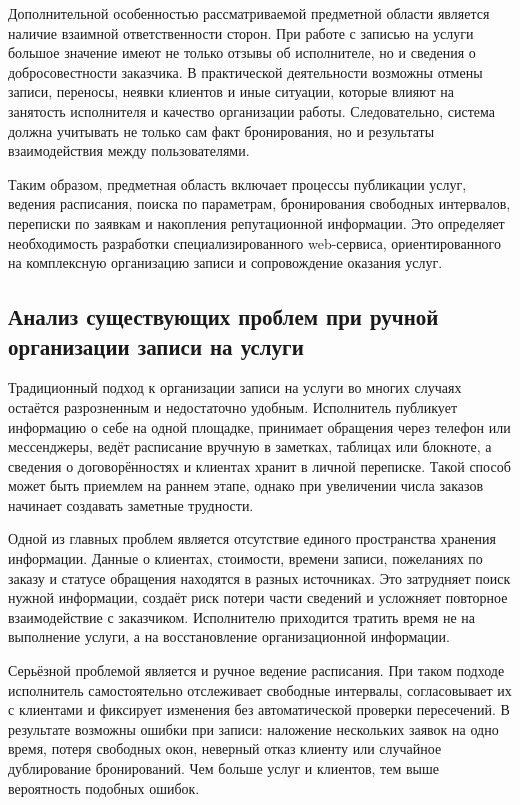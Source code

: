 Дополнительной особенностью рассматриваемой предметной области является наличие взаимной ответственности сторон. При работе с записью на услуги большое значение имеют не только отзывы об исполнителе, но и сведения о добросовестности заказчика. В практической деятельности возможны отмены записи, переносы, неявки клиентов и иные ситуации, которые влияют на занятость исполнителя и качество организации работы. Следовательно, система должна учитывать не только сам факт бронирования, но и результаты взаимодействия между пользователями.

Таким образом, предметная область включает процессы публикации услуг, ведения расписания, поиска по параметрам, бронирования свободных интервалов, переписки по заявкам и накопления репутационной информации. Это определяет необходимость разработки специализированного web-сервиса, ориентированного на комплексную организацию записи и сопровождение оказания услуг.

\subsection{Анализ существующих проблем при ручной организации записи на услуги}

Традиционный подход к организации записи на услуги во многих случаях остаётся разрозненным и недостаточно удобным. Исполнитель публикует информацию о себе на одной площадке, принимает обращения через телефон или мессенджеры, ведёт расписание вручную в заметках, таблицах или блокноте, а сведения о договорённостях и клиентах хранит в личной переписке. Такой способ может быть приемлем на раннем этапе, однако при увеличении числа заказов начинает создавать заметные трудности.

Одной из главных проблем является отсутствие единого пространства хранения информации. Данные о клиентах, стоимости, времени записи, пожеланиях по заказу и статусе обращения находятся в разных источниках. Это затрудняет поиск нужной информации, создаёт риск потери части сведений и усложняет повторное взаимодействие с заказчиком. Исполнителю приходится тратить время не на выполнение услуги, а на восстановление организационной информации.

Серьёзной проблемой является и ручное ведение расписания. При таком подходе исполнитель самостоятельно отслеживает свободные интервалы, согласовывает их с клиентами и фиксирует изменения без автоматической проверки пересечений. В результате возможны ошибки при записи: наложение нескольких заявок на одно время, потеря свободных окон, неверный отказ клиенту или случайное дублирование бронирований. Чем больше услуг и клиентов, тем выше вероятность подобных ошибок.

